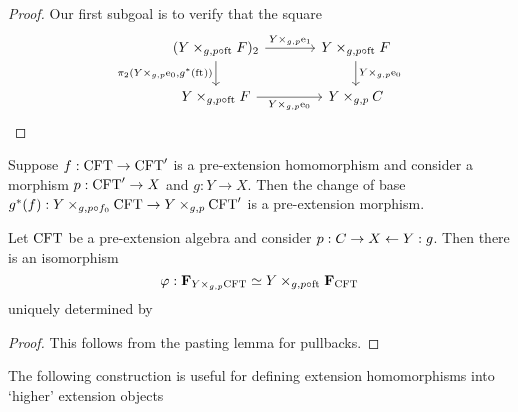 \begin{proof}
Our first subgoal is to verify that the square
\begin{equation*}
\begin{tikzcd}[column sep=large]
(\pullback{Y}{\stesysf}{g}{p\circ\eft})_2
  \ar{r}{\cobesys{Y}{\efamext}{g}{p}} 
  \ar{d}[swap]{\pullbackpr{2}{\cobesys{Y}{\ectxext}{g}{p}}{g^\ast(\eft)}} 
  & 
\pullback{Y}{\stesysf}{g}{p\circ\eft}
  \ar{d}{\cobesys{Y}{\ectxext}{g}{p}}
  \\
\pullback{Y}{\stesysf}{g}{p\circ\eft}
  \ar{r}[swap]{\cobesys{Y}{\ectxext}{g}{p}} 
  & 
\pullback{Y}{\stesysc}{g}{p}
\end{tikzcd}
\end{equation*}
\end{proof}

\begin{lem}
Suppose $f:\mathrm{CFT}\to \mathrm{CFT}'$ is a pre-extension homomorphism and consider a morphism
$p:\mathrm{CFT}'\to X$ and $g:Y\to X$. Then the change of base 
$g^\ast(f):\cobesys{Y}{\stesys}{g}{p\circ f_0}\to
\cobesys{Y}{\stesys'}{g}{p}$ is a pre-extension morphism.
\end{lem}

\begin{lem}
Let $\mathrm{CFT}$ be a pre-extension algebra and consider $p:C\rightarrow X\leftarrow Y:g$.
Then there is an isomorphism
\begin{equation*}
\varphi:\famesys{\cobesys{Y}{\stesys}{g}{p}}
  \simeq
\cobesys{Y}{\famesys{\stesys}}{g}{p\circ\eft}
\end{equation*}
uniquely determined by
\end{lem}

\begin{proof}
This follows from the pasting lemma for pullbacks.
\end{proof}

The following construction is useful for defining extension homomorphisms into
`higher' extension objects


